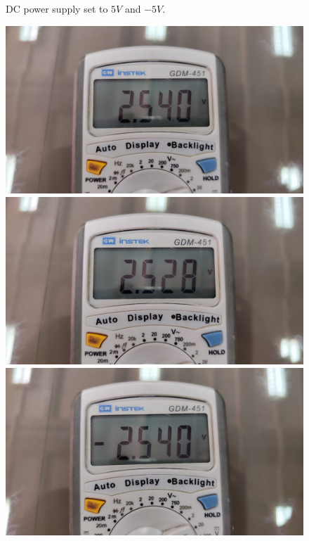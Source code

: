\documentclass[11pt]{article}
\begin{document}
\begin{question}
\begin{subquestion}
{\begin{figure}[H]
                \caption{DC power supply set to $5V$ and $-5V$.}
            \end{figure}
            \begin{figure}[H]
                \centering
                \includegraphics[scale=0.08,angle=0]{Fig/15.jpeg}
                \includegraphics[scale=0.08,angle=0]{Fig/16.jpeg}
                \includegraphics[scale=0.08,angle=0]{Fig/17.jpeg}

\end{figure}}
\end{subquestion}
\end{question}
\end{document}
